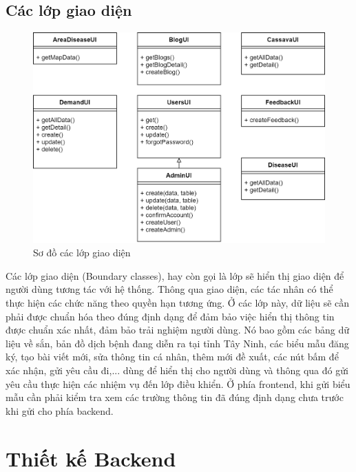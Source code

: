 \documentclass[./../main.tex]{subfiles}
\begin{document}
\subsection{Các lớp giao diện}
\begin{figure}[H]
	\centering
	\includegraphics[width=\linewidth]{./img/boundary.png}
	\caption{Sơ đồ các lớp giao diện}
\end{figure}
Các lớp giao diện (Boundary classes), hay còn gọi là lớp sẽ hiển thị giao diện để người dùng tương tác với hệ thống. Thông qua giao diện, các tác nhân có thể thực hiện các chức năng theo quyền hạn tương ứng. Ở các lớp này, dữ liệu sẽ cần phải được chuẩn hóa theo đúng định dạng để đảm bảo việc hiển thị thông tin được chuẩn xác nhất, đảm bảo trải nghiệm người dùng. Nó bao gồm các bảng dữ liệu về sắn, bản đồ dịch bệnh đang diễn ra tại tỉnh Tây Ninh, các biểu mẫu đăng ký, tạo bài viết mới, sửa thông tin cá nhân, thêm mới đề xuất, các nút bấm để xác nhận, gửi yêu cầu đi,... dùng để hiển thị cho người dùng và thông qua đó gửi yêu cầu thực hiện các nhiệm vụ đến lớp điều khiển. Ở phía frontend, khi gửi biểu mẫu cần phải kiểm tra xem các trường thông tin đã đúng định dạng chưa trước khi gửi cho phía backend.


\section{Thiết kế Backend}
\end{document}
